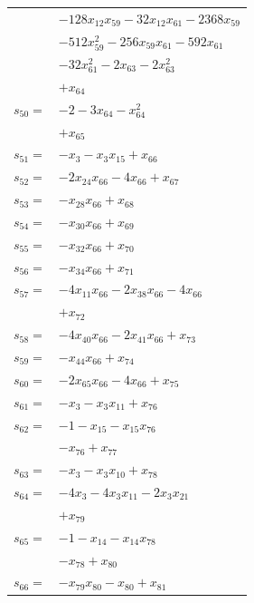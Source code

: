 \begin{longtable}{@{}r@{\;}l@{}}
 & \(\displaystyle -128x_{12}x_{59} -32x_{12}x_{61} -2368x_{59}\) \\
 & \(\displaystyle -512x_{59}^{2} -256x_{59}x_{61} -592x_{61}\) \\
 & \(\displaystyle -32x_{61}^{2} -2x_{63} -2x_{63}^{2}\) \\
 & \(\displaystyle +x_{64}\) \\[3pt]
\(s_{50}=\) & \(\displaystyle -2 -3x_{64} -x_{64}^{2}\) \\
 & \(\displaystyle +x_{65}\) \\[3pt]
\(s_{51}=\) & \(\displaystyle -x_{3} -x_{3}x_{15} +x_{66}\) \\[3pt]
\(s_{52}=\) & \(\displaystyle -2x_{24}x_{66} -4x_{66} +x_{67}\) \\[3pt]
\(s_{53}=\) & \(\displaystyle -x_{28}x_{66} +x_{68}\) \\[3pt]
\(s_{54}=\) & \(\displaystyle -x_{30}x_{66} +x_{69}\) \\[3pt]
\(s_{55}=\) & \(\displaystyle -x_{32}x_{66} +x_{70}\) \\[3pt]
\(s_{56}=\) & \(\displaystyle -x_{34}x_{66} +x_{71}\) \\[3pt]
\(s_{57}=\) & \(\displaystyle -4x_{11}x_{66} -2x_{38}x_{66} -4x_{66}\) \\
 & \(\displaystyle +x_{72}\) \\[3pt]
\(s_{58}=\) & \(\displaystyle -4x_{40}x_{66} -2x_{41}x_{66} +x_{73}\) \\[3pt]
\(s_{59}=\) & \(\displaystyle -x_{44}x_{66} +x_{74}\) \\[3pt]
\(s_{60}=\) & \(\displaystyle -2x_{65}x_{66} -4x_{66} +x_{75}\) \\[3pt]
\(s_{61}=\) & \(\displaystyle -x_{3} -x_{3}x_{11} +x_{76}\) \\[3pt]
\(s_{62}=\) & \(\displaystyle -1 -x_{15} -x_{15}x_{76}\) \\
 & \(\displaystyle -x_{76} +x_{77}\) \\[3pt]
\(s_{63}=\) & \(\displaystyle -x_{3} -x_{3}x_{10} +x_{78}\) \\[3pt]
\(s_{64}=\) & \(\displaystyle -4x_{3} -4x_{3}x_{11} -2x_{3}x_{21}\) \\
 & \(\displaystyle +x_{79}\) \\[3pt]
\(s_{65}=\) & \(\displaystyle -1 -x_{14} -x_{14}x_{78}\) \\
 & \(\displaystyle -x_{78} +x_{80}\) \\[3pt]
\(s_{66}=\) & \(\displaystyle -x_{79}x_{80} -x_{80} +x_{81}\) \\[3pt]

\end{longtable}
